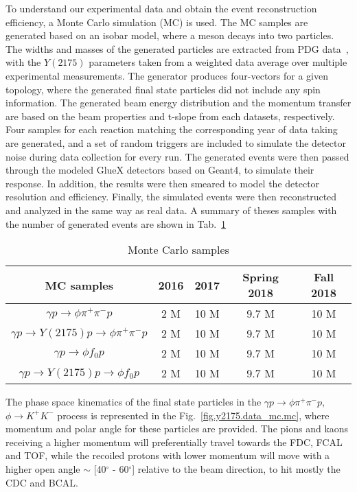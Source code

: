 To understand our experimental data and obtain the event reconstruction efficiency, a Monte Carlo simulation (MC) is used. The MC samples are generated based on an isobar model, where a meson decays into two particles. The widths and masses of the generated particles are extracted from PDG data~\cite{Tanabashi18}, with the $Y(2175)$ parameters taken from a weighted data average over multiple experimental measurements. The generator produces four-vectors for a given topology, where the generated final state particles did not include any spin information. The generated beam energy distribution and the momentum transfer are based on the beam properties and t-slope from each datasets, respectively. Four samples for each reaction matching the corresponding year of data taking are generated, and a set of random triggers are included to simulate the detector noise during data collection for every run. The generated events were then passed through the modeled GlueX detectors based on Geant4, to simulate their response. In addition, the results were then smeared to model the detector resolution and efficiency. Finally, the simulated events were then reconstructed and analyzed in the same way as real data. A summary of theses samples with the number of generated events are shown in Tab.~\ref{tab.y2175.data_mc.mc}   

\begin{table}[H]
    \centering
    \caption{Monte Carlo samples}
    \label{tab.y2175.data_mc.mc}
    \begin{tabular}{|c|c|c|c|c|}
        \hline
        MC samples & 2016 & 2017 & Spring 2018 & Fall 2018 \\
        \hline
        $\gamma p \rightarrow \phi \pi^+ \pi^- p$ & 2 M & 10 M & 9.7 M & 10 M \\
        \hline
        $\gamma p \rightarrow Y(2175) p \rightarrow \phi \pi^+ \pi^- p$ & 2 M & 10 M & 9.7 M & 10 M \\
        \hline
        $\gamma p \rightarrow \phi f_0 p$ & 2 M & 10 M & 9.7 M & 10 M \\
        \hline
        $\gamma p \rightarrow Y(2175) p \rightarrow \phi f_0 p$ & 2 M & 10 M & 9.7 M & 10 M \\
        \hline
    \end{tabular}
\end{table}

The phase space kinematics of the final state particles in the $\gamma p \rightarrow \phi \pi^+ \pi^- p$, $\phi \rightarrow K^+ K^-$ process is represented in the Fig.~\ref{fig.y2175.data_mc.mc}, where momentum and polar angle for these particles are provided. The pions and kaons receiving a higher momentum will preferentially travel towards the FDC, FCAL and TOF, while the recoiled protons with lower momentum will move with a higher open angle $\sim$ [40$^{\circ}$ - 60$^{\circ}$] relative to the beam direction, to hit mostly the CDC and BCAL.

